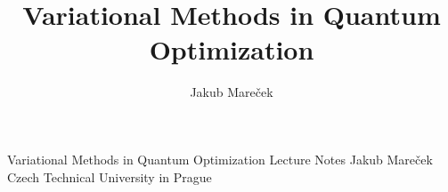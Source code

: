 \documentclass[a4paper,10pt,reqno]{amsbook}
\title{Variational Methods in Quantum Optimization}
\author{Jakub Mare{\v c}ek}
\institute{CTU}
\def\biblio{}
\numberwithin{equation}{\numberbychaporsect}
\numberwithin{figure}{\numberbychaporsect}
\numberwithin{table}{\numberbychaporsect}
\begin{document}
\def\biblio{}

\vfill
\LARGE{Variational Methods in Quantum Optimization}
\vskip 1cm
\Large{Lecture Notes}
\vskip 5cm
\Large{Jakub Mare{\v c}ek}
\vskip 1cm
\normalsize{Czech Technical University in Prague}

\tableofcontents






% 
% 
% 
% 
% 
% 
% 
% 

\providecommand{\bbletal}{et al.}

\clearpage


\end{document}
